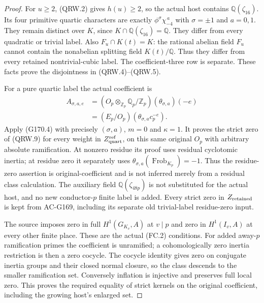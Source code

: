 \begin{proof}
For $u\geq2$, (QRW.2) gives $h(u)\geq2$, so the actual host
contains $\mathbb Q(\zeta_{16})$.
Its four primitive quartic characters are exactly
$\phi^\sigma\chi_{-4}^{\,a}$ with $\sigma=\pm1$ and $a=0,1$.
They remain distinct over $K$, since
$K\cap\mathbb Q(\zeta_{16})=\mathbb Q$.
They differ from every quadratic or trivial label.
Also $F_u\cap K(t)=K$: the rational abelian field $F_u$
cannot contain the nonabelian splitting field $K(t)/\mathbb Q$.
Thus they differ from every retained nontrivial-cubic label.
The coefficient-three row is separate.
These facts prove the disjointness in (QRW.4)--(QRW.5).

For a pure quartic label the actual coefficient is
\[
 \begin{aligned}
 A_{\sigma,a,e}
   &=(O_p\otimes_{\mathbb Z_p}\mathbb Q_p/\mathbb Z_p)
                                           (\theta_{\sigma,a})(-e)\\
   &=(E_p/O_p)(\theta_{\sigma,a}c_p^{-e}).
 \end{aligned}
 \tag{QRW.9}
\]
Apply (G170.4) with precisely $(\sigma,a)$, $m=0$ and $\kappa=1$.
It proves the strict zero of (QRW.9) for every weight in
$Z_{\rm quart}^{\rm ref}$, on this same original $O_p$ with
arbitrary absolute ramification.
At nonzero residue its proof uses residual cyclotomic inertia;
at residue zero it separately uses
$\theta_{\sigma,a}(\operatorname{Frob}_{K_p})=-1$.
Thus the residue-zero assertion is original-coefficient and is
not inferred merely from a residual class calculation.
The auxiliary field $\mathbb Q(\zeta_{48p})$ is not substituted
for the actual host, and no new conductor-$p$ finite label is added.
Every strict zero in $Z_{\rm retained}$ is kept from AC-G169,
including its separate old trivial-label residue-zero input.

The source imposes zero in full $H^1(G_{K_v},A)$ at $v\mid p$
and zero in $H^1(I_v,A)$ at every other finite place.
These are the actual (FC.2) conditions.
For added away-$p$ ramification primes the coefficient is
unramified; a cohomologically zero inertia restriction is then
a zero cocycle.  The cocycle identity gives zero on conjugate
inertia groups and their closed normal closure, so the class
descends to the smaller ramification set.
Conversely inflation is injective and preserves full local zero.
This proves the required equality of strict kernels on the
original coefficient, including the growing host's enlarged set.


\end{proof}

